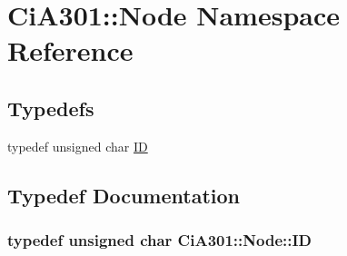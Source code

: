 \hypertarget{namespace_ci_a301_1_1_node}{\section{Ci\-A301\-:\-:Node Namespace Reference}
\label{namespace_ci_a301_1_1_node}
}
\subsection*{Typedefs}
\begin{DoxyCompactItemize}
\item 
typedef unsigned char \hyperlink{namespace_ci_a301_1_1_node_a9c2ced538fec9de6165937ed18e8617b}{I\-D}
\end{DoxyCompactItemize}


\subsection{Typedef Documentation}
\hypertarget{namespace_ci_a301_1_1_node_a9c2ced538fec9de6165937ed18e8617b}{
\subsubsection[{I\-D}]{\setlength{\rightskip}{0pt plus 5cm}typedef unsigned char {\bf Ci\-A301\-::\-Node\-::\-I\-D}}}\label{namespace_ci_a301_1_1_node_a9c2ced538fec9de6165937ed18e8617b}
